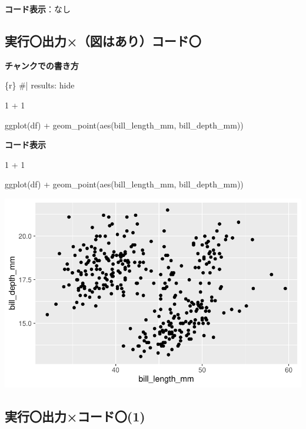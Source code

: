 \documentclass[
  b5paper,
  xelatex, ja=standard]{bxjsbook}
\newenvironment{Shaded}{\begin{snugshade}}{\end{snugshade}}
\newcommand{\DecValTok}[1]{\textcolor[rgb]{0.68,0.00,0.00}{#1}}
\newcommand{\FunctionTok}[1]{\textcolor[rgb]{0.28,0.35,0.67}{#1}}
\newcommand{\InformationTok}[1]{\textcolor[rgb]{0.37,0.37,0.37}{#1}}
\newcommand{\NormalTok}[1]{\textcolor[rgb]{0.00,0.23,0.31}{#1}}
\newcommand{\SpecialCharTok}[1]{\textcolor[rgb]{0.37,0.37,0.37}{#1}}
\begin{document}
\textbf{コード表示}：なし

\subsection{実行〇\textbar 出力×（図はあり）\textbar コード〇}

\textbf{チャンクでの書き方}

\begin{Shaded}
\begin{Highlighting}[]
\InformationTok{\textasciigrave{}\textasciigrave{}\textasciigrave{}\{r\}}
\InformationTok{\#| results: hide}

\InformationTok{1 + 1}


\InformationTok{ggplot(df) +}
\InformationTok{  geom\_point(aes(bill\_length\_mm, bill\_depth\_mm))}
\InformationTok{\textasciigrave{}\textasciigrave{}\textasciigrave{}}
\end{Highlighting}
\end{Shaded}

\textbf{コード表示}

\begin{Shaded}
\begin{Highlighting}[]
\DecValTok{1} \SpecialCharTok{+} \DecValTok{1}


\FunctionTok{ggplot}\NormalTok{(df) }\SpecialCharTok{+}
  \FunctionTok{geom\_point}\NormalTok{(}\FunctionTok{aes}\NormalTok{(bill\_length\_mm, bill\_depth\_mm))}
\end{Highlighting}
\end{Shaded}

\includegraphics{basic_files/figure-pdf/unnamed-chunk-6-1.pdf}

\subsection{実行〇\textbar 出力×\textbar コード〇(1)}
\end{document}
